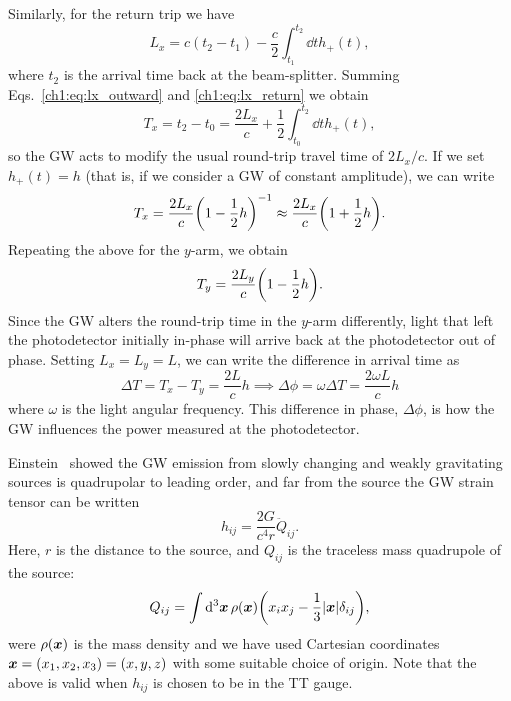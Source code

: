 Similarly, for the return trip we have
\begin{equation}\label{ch1:eq:lx_return}
    L_x = c(t_2 - t_1) - \frac{c}{2} \int_{t_1}^{t_2} \dd{t} h_+(t),
\end{equation}
where $t_2$ is the arrival time back at the beam-splitter.
Summing Eqs.~\ref{ch1:eq:lx_outward} and \ref{ch1:eq:lx_return} we obtain
\begin{equation}
    T_x = t_2 - t_0 = \frac{2L_x}{c} + \frac{1}{2}\int_{t_0}^{t_2} \dd{t} h_+(t),
\end{equation}
so the GW acts to modify the usual round-trip travel time of $2L_x/c$.
If we set $h_+(t) = h$ (that is, if we consider a GW of constant amplitude), we can write
\begin{equation}
    T_x = \frac{2L_x}{c}\qty(1-\frac{1}{2}h)^{-1} \approx \frac{2L_x}{c}\qty(1+\frac{1}{2}h).
\end{equation}
Repeating the above for the $y$-arm, we obtain
\begin{equation}
    T_y = \frac{2L_y}{c}\qty(1-\frac{1}{2}h).
\end{equation}
Since the GW alters the round-trip time in the $y$-arm differently, light that left the photodetector initially in-phase will arrive back at the photodetector out of phase.
Setting $L_x = L_y = L$, we can write the difference in arrival time as
\begin{equation}
    \Delta T = T_x - T_y = \frac{2L}{c}h \implies \Delta \phi = \omega \Delta T = \frac{2\omega L}{c}h
\end{equation}
where $\omega$ is the light angular frequency. 
This difference in phase, $\Delta\phi$, is how the GW influences the power measured at the photodetector. 

Einstein~\cite{Einstein:1918btx} showed the GW emission from slowly changing and weakly gravitating sources is quadrupolar to leading order, and far from the source the GW strain tensor can be written
\begin{equation}\label{ch1:eq:quadrupole_strain}
    h_{ij} = \frac{2G}{c^4 r}\ddot{Q}_{ij}.
\end{equation}
Here, $r$ is the distance to the source, and $Q_{ij}$ is the traceless mass quadrupole of the source:
\begin{equation}\label{ch1:eq:quadrupole}
    Q_{ij} = \int \dd[3]{\vb*{x}} \rho(\vb*{x}) \qty(x_i x_j - \frac{1}{3} \abs{\vb*{x}} \delta_{ij}),
\end{equation}
were $\rho(\vb*{x})$ is the mass density and we have used Cartesian coordinates $\vb*{x} = (x_1, x_2, x_3) = (x,y,z)$ with some suitable choice of origin.
Note that the above is valid when $h_{ij}$ is chosen to be in the TT gauge.

